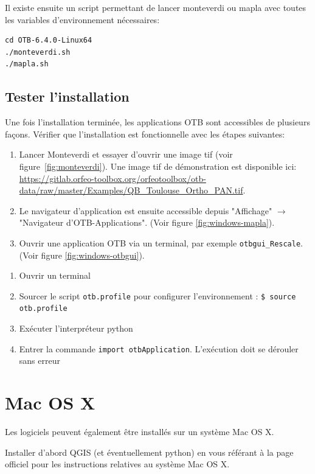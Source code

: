 \documentclass[10pt,a4paper]{article}
\begin{document}
Il existe ensuite un script permettant de lancer monteverdi ou mapla avec toutes les
variables d'environnement nécessaires:
\begin{verbatim}
cd OTB-6.4.0-Linux64
./monteverdi.sh
./mapla.sh
\end{verbatim}

\subsection{Tester l'installation}
Une fois l'installation terminée, les applications OTB sont accessibles de
plusieurs façons. Vérifier que l'installation est fonctionnelle avec les étapes
suivantes:
\begin{enumerate}

\item Lancer Monteverdi et essayer d'ouvrir une image tif (voir
figure~\ref{fig:monteverdi}). Une image tif de démonstration est disponible ici:
\url{https://gitlab.orfeo-toolbox.org/orfeotoolbox/otb-data/raw/master/Examples/QB\_Toulouse\_Ortho\_PAN.tif}.

\item Le navigateur d'application est ensuite accessible depuis "Affichage"
$\rightarrow$ "Navigateur d'OTB-Applications".
(Voir figure \ref{fig:windows-mapla}).

\item Ouvrir une application OTB via un terminal, par exemple
\texttt{otbgui\_Rescale}. (Voir figure \ref{fig:windows-otbgui}).

\end{enumerate}

\begin{enumerate}
 \item Ouvrir un terminal
 \item Sourcer le script \verb?otb.profile? pour configurer l'environnement : \verb?$ source otb.profile?
 \item Exécuter l'interpréteur python
 \item Entrer la commande \verb?import otbApplication?. L'exécution doit se dérouler sans erreur
\end{enumerate}


\clearpage
\section{Mac OS X}

Les logiciels peuvent également être installés sur un système Mac OS X.

Installer d'abord QGIS (et éventuellement python) en vous référant à la page officiel pour les instructions
relatives au système Mac OS X.
\end{document}
